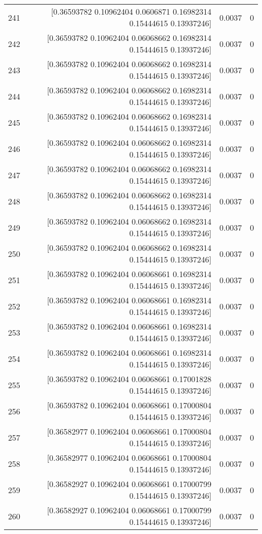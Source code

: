\begin{longtable}{lrrr}
241 & [0.36593782 0.10962404 0.0606871  0.16982314 0.15444615 0.13937246] & 0.0037 & 0 \\
242 & [0.36593782 0.10962404 0.06068662 0.16982314 0.15444615 0.13937246] & 0.0037 & 0 \\
243 & [0.36593782 0.10962404 0.06068662 0.16982314 0.15444615 0.13937246] & 0.0037 & 0 \\
244 & [0.36593782 0.10962404 0.06068662 0.16982314 0.15444615 0.13937246] & 0.0037 & 0 \\
245 & [0.36593782 0.10962404 0.06068662 0.16982314 0.15444615 0.13937246] & 0.0037 & 0 \\
246 & [0.36593782 0.10962404 0.06068662 0.16982314 0.15444615 0.13937246] & 0.0037 & 0 \\
247 & [0.36593782 0.10962404 0.06068662 0.16982314 0.15444615 0.13937246] & 0.0037 & 0 \\
248 & [0.36593782 0.10962404 0.06068662 0.16982314 0.15444615 0.13937246] & 0.0037 & 0 \\
249 & [0.36593782 0.10962404 0.06068662 0.16982314 0.15444615 0.13937246] & 0.0037 & 0 \\
250 & [0.36593782 0.10962404 0.06068662 0.16982314 0.15444615 0.13937246] & 0.0037 & 0 \\
251 & [0.36593782 0.10962404 0.06068661 0.16982314 0.15444615 0.13937246] & 0.0037 & 0 \\
252 & [0.36593782 0.10962404 0.06068661 0.16982314 0.15444615 0.13937246] & 0.0037 & 0 \\
253 & [0.36593782 0.10962404 0.06068661 0.16982314 0.15444615 0.13937246] & 0.0037 & 0 \\
254 & [0.36593782 0.10962404 0.06068661 0.16982314 0.15444615 0.13937246] & 0.0037 & 0 \\
255 & [0.36593782 0.10962404 0.06068661 0.17001828 0.15444615 0.13937246] & 0.0037 & 0 \\
256 & [0.36593782 0.10962404 0.06068661 0.17000804 0.15444615 0.13937246] & 0.0037 & 0 \\
257 & [0.36582977 0.10962404 0.06068661 0.17000804 0.15444615 0.13937246] & 0.0037 & 0 \\
258 & [0.36582977 0.10962404 0.06068661 0.17000804 0.15444615 0.13937246] & 0.0037 & 0 \\
259 & [0.36582927 0.10962404 0.06068661 0.17000799 0.15444615 0.13937246] & 0.0037 & 0 \\
260 & [0.36582927 0.10962404 0.06068661 0.17000799 0.15444615 0.13937246] & 0.0037 & 0 \\

\end{longtable}
